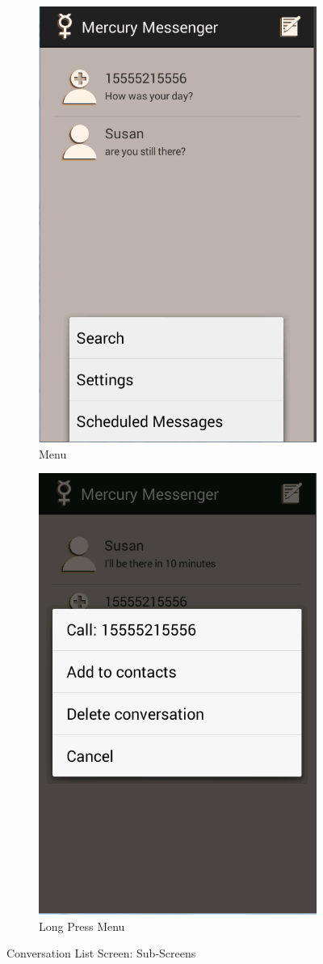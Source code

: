 \documentclass{article}
\begin{document}
\begin{figure}[h!]
\centering
	\begin{subfigure}[b]{0.49\textwidth}
		\includegraphics[width=.49\textwidth]{"./Screen_shots/Main_Screen_menu"}{}
		\caption{Menu}
		\label{fig:MainScreenMenu}
	\end{subfigure} %
	\begin{subfigure}[b]{0.49\textwidth}
\includegraphics[width=.49\textwidth]{"./Screen_shots/Main_Screen_Long_Press2"}{}
\caption{Long Press Menu}
\label{fig:MainScreenLong}
	\end{subfigure}
	\caption{Conversation List Screen: Sub-Screens}

\end{figure}
\end{document}
